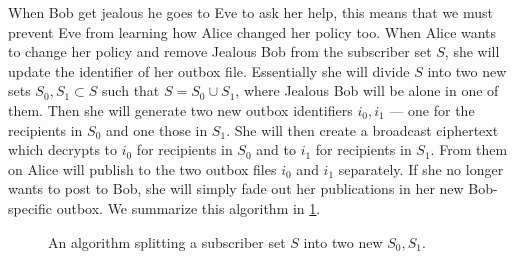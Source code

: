 When Bob get jealous he goes to Eve to ask her help, this means that we must 
prevent Eve from learning how Alice changed her policy too.
When Alice wants to change her policy and remove Jealous Bob from the 
subscriber set \(S\), she will update the identifier of her outbox file.
Essentially she will divide \(S\) into two new sets \(S_0, S_1\subset S\) such 
that \(S = S_0\cup S_1\), where Jealous Bob will be alone in one of them.
Then she will generate two new outbox identifiers \(i_0, i_1\) --- one for the 
recipients in \(S_0\) and one those in \(S_1\).
She will then create a broadcast ciphertext which decrypts to \(i_0\) for 
recipients in \(S_0\) and to \(i_1\) for recipients in \(S_1\).
From them on Alice will publish to the two outbox files \(i_0\) and \(i_1\) 
separately.
If she no longer wants to post to Bob, she will simply fade out her 
publications in her new Bob-specific outbox.
We summarize this algorithm in \cref{SplitGroup}.

\begin{figure}
  \caption{%
    An algorithm splitting a subscriber set \(S\) into two new \(S_0, S_1\).
  }\label{SplitGroup}
\end{figure}

